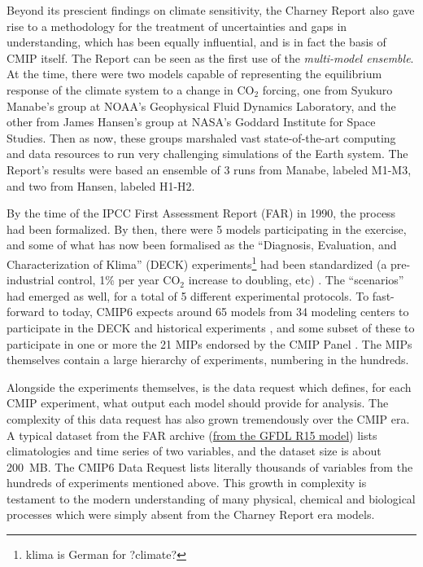 \documentclass[gmd,manuscript]{copernicus}
\begin{document}
Beyond its prescient findings on climate sensitivity, the Charney
Report also gave rise to a methodology for the treatment of
uncertainties and gaps in understanding, which has been equally
influential, and is in fact the basis of CMIP itself. The Report can
be seen as the first use of the \emph{multi-model ensemble}. At the
time, there were two models capable of representing the equilibrium
response of the climate system to a change in CO$_2$ forcing, one from
Syukuro Manabe's group at NOAA's Geophysical Fluid Dynamics
Laboratory, and the other from James Hansen's group at NASA's Goddard
Institute for Space Studies. Then as now, these groups marshaled vast
state-of-the-art computing and data resources to run very challenging
simulations of the Earth system. The Report's results were based an
ensemble of 3 runs from Manabe, labeled M1-M3, and two from Hansen,
labeled H1-H2.

By the time of the IPCC First Assessment Report (FAR) in 1990, the
process had been formalized. By then, there were 5 models
participating in the exercise, and some of what has now been
formalised as the ``Diagnosis, Evaluation, and Characterization of
Klima'' (DECK) experiments\footnote{klima is German for ?climate?} had
been standardized (a pre-industrial control, 1\% per year CO$_2$
increase to doubling, etc) . The ``scenarios'' had emerged as well,
for a total of 5 different experimental protocols. To fast-forward to
today, CMIP6 expects around 65 models from 34 modeling centers
\citep[in 14 countries, in stark contrast to the US monopoly
in][]{ref:charneyetal1979} to participate in the DECK and historical
experiments \citep[Table~2 of][]{ref:eyringetal2016a}, and some subset
of these to participate in one or more the 21 MIPs endorsed by the
CMIP Panel \citep[Table~3 of][]{ref:eyringetal2016a}. The MIPs
themselves contain a large hierarchy of experiments, numbering in the
hundreds.

Alongside the experiments themselves, is the data request which
defines, for each CMIP experiment, what output each model should
provide for analysis. The complexity of this data request has also
grown tremendously over the CMIP era. A typical dataset from the FAR
archive (\href{https://goo.gl/M1WSJy}{from the GFDL R15 model}) lists
climatologies and time series of two variables, and the dataset size
is about 200~MB. The CMIP6 Data Request \citep[][replace with GMD
ref?]{ref:juckesetal2015} lists literally thousands of variables from
the hundreds of experiments mentioned above. This growth in complexity
is testament to the modern understanding of many physical, chemical
and biological processes which were simply absent from the Charney
Report era models.
\end{document}
